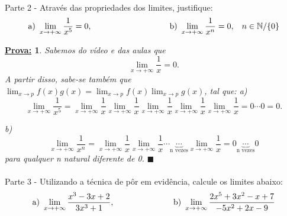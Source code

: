\documentclass{article}
\newtheorem*{proof*}{\underline{Prova:}}
\renewcommand\qedsymbol{$\blacksquare$}
\begin{document}
\paragraph{}Parte 2 - Atrav\'es das propriedades dos limites, justifique:
$$
\text{a) }\lim_{x\to+\infty}\frac{1}{x^5} = 0,\hspace{3.3cm}
\text{b) }\lim_{x\to+\infty}\frac{1}{x^n} = 0,\hspace{.3cm} n\in\mathbb{N}\slash\{0\}
$$
\begin{proof*}
Sabemos do v\'ideo e das aulas que
$$
\lim_{x\to+\infty}\frac{1}{x} = 0.
$$
A partir disso, sabe-se tamb\'em que $\lim_{x\to{p}}f(x)g(x) = \lim_{x\to{p}}f(x)\lim_{x\to{p}}g(x)$, tal que:
a)
$$
\lim_{x\to+\infty}\frac{1}{x^5} = \lim_{x\to+\infty}\frac{1}{x}\lim_{x\to+\infty}\frac{1}{x}\lim_{x\to+\infty}\frac{1}{x}\lim_{x\to+\infty}\frac{1}{x}\lim_{x\to+\infty}\frac{1}{x} = 0\cdots0 = 0.
$$

b)
$$
\lim_{x\to+\infty}\frac{1}{x^n} = \lim_{x\to+\infty}\frac{1}{x}\lim_{x\to+\infty}\frac{1}{x}\cdots\underbrace{\cdots}_{\text{n vezes}}\lim_{x\to+\infty}\frac{1}{x} = 0\underbrace{\cdots}_{\text{n vezes}}0
$$
para qualquer n natural diferente de 0.
\qedsymbol
\end{proof*}

\paragraph{}Parte 3 - Utilizando a t\'ecnica de p\^or em evid\^encia, calcule os limites abaixo:
$$
\text{a) }\lim_{x\to+\infty}\frac{x^3 - 3x + 2}{3x^3 + 1},\hspace{2.5cm}
\text{b) }\lim_{x\to+\infty}\frac{2x^5 + 3x^2 - x + 7}{-5x^2 + 2x - 9}
$$
\end{document}
